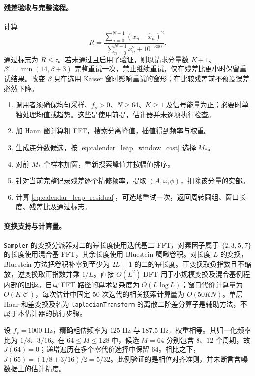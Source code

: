 \paragraph{残差验收与完整流程。}
计算
\begin{equation}\label{eq:calendar_leap_residual}
R=\frac{\sum_{n=0}^{N-1}(x_n-\widehat x_n)^2}
        {\sum_{n=0}^{N-1}x_n^2+10^{-300}}.
\end{equation}
通过标志为 \(R\le\tau\)。若未通过且启用了验证，则以请求分量数 \(K+1\)、\(\beta'=\min(14,\beta+3)\) 完整重试一次，禁止继续重试，仅在残差比更小时保留重试结果。改变 \(\beta\) 只在选用 Kaiser 窗时影响重试的窗形；在比较残差前不预设误差必然下降。

\begin{enumerate}[label=(\arabic*)]
    \item 调用者须确保均匀采样、\(f_s>0\)、\(N\ge64\)、\(K\ge1\) 及信号能量为正；必要时单独处理均值或趋势。这些是使用前提，估计器并未逐项执行检查。
    \item 加 Hann 窗计算粗 FFT，搜索分离峰值，插值得到频率与权重。
    \item 生成连分数候选，按 \cref{eq:calendar_leap_window_cost} 选择 \(M_*\)。
    \item 对前 \(M_*\) 个样本加窗，重新搜索峰值并按幅值排序。
    \item 针对当前完整记录残差逐个精修频率，提取 \((A,\omega,\phi)\)，扣除该分量的实部。
    \item 计算 \cref{eq:calendar_leap_residual}，可选地重试一次，返回周转圆组、窗口长度、残差比及通过标志。
\end{enumerate}

\paragraph{变换支持与计算量。}
\texttt{Sampler} 的变换分派器对二的幂长度使用迭代基二 FFT，对素因子属于 \(\{2,3,5,7\}\) 的长度使用混合基 FFT，其余长度使用 Bluestein 啁啾卷积。对长度 \(L\) 的变换，Bluestein 方法把卷积补零到至少为 \(2L-1\) 的二的幂长度。正变换取负指数且不缩放，逆变换取正指数并乘 \(1/L\)。直接 \(O(L^2)\) DFT 用于小规模变换及混合基例程内部的回退。自动 FFT 路径的算术复杂度为 \(O(L\log L)\)；窗口代价计算量为 \(O(K|\mathcal C|)\)，每次估计中固定 \(50\) 次迭代的相关搜索计算量为 \(O(50KN)\)。单层 Haar 和差变换及名为 \texttt{laplacianTransform} 的离散二阶差分算子是辅助方法，不属于本估计器的执行步骤。

\begin{example}[整数周期窗口]\label{ex:calendar_leap_window}
设 \(f_s=1000\) Hz，精确粗估频率为 \(125\) Hz 与 \(187.5\) Hz，权重相等。其归一化频率比为 \(1/8\)、\(3/16\)。在 \(64\le M\le128\) 中，候选 \(M=64\) 分别包含 \(8\)、\(12\) 个周期，故 \(J(64)=0\)；递增遍历在多个零代价选择中保留 \(64\)。相比之下，\(J(65)=(1/8+3/16)/2=5/32\)。此例验证的是相位对齐准则，并未断言含噪数据上的估计精度。
\end{example}

